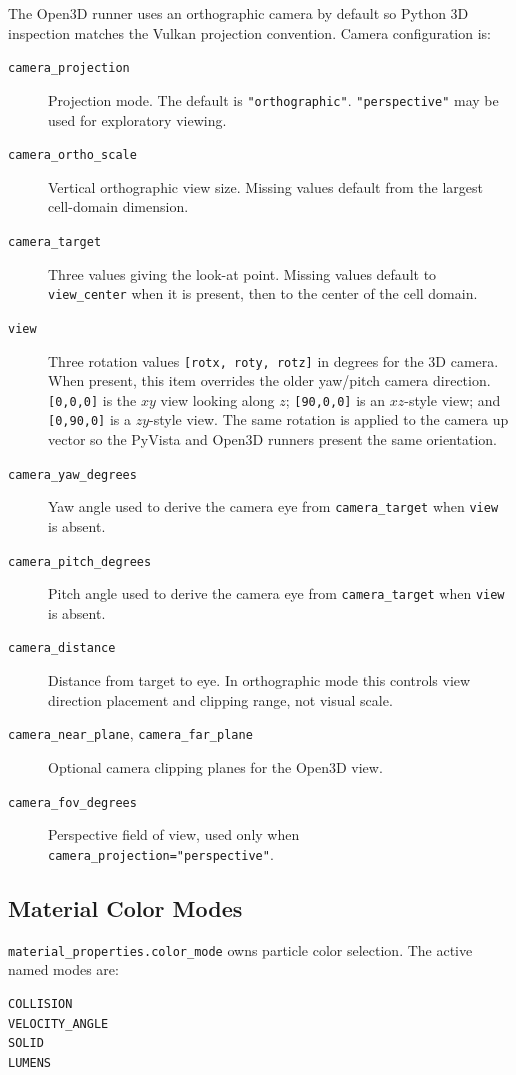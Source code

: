 The Open3D runner uses an orthographic camera by default so Python 3D
inspection matches the Vulkan projection convention.  Camera configuration is:
\begin{description}
    \item[\texttt{camera\_projection}] Projection mode.  The default is
    \texttt{"orthographic"}.  \texttt{"perspective"} may be used for
    exploratory viewing.
    \item[\texttt{camera\_ortho\_scale}] Vertical orthographic view size.
    Missing values default from the largest cell-domain dimension.
    \item[\texttt{camera\_target}] Three values giving the look-at point.
    Missing values default to \texttt{view\_center} when it is present, then
    to the center of the cell domain.
    \item[\texttt{view}] Three rotation values \texttt{[rotx, roty, rotz]} in
    degrees for the 3D camera.  When present, this item overrides the older
    yaw/pitch camera direction.  \texttt{[0,0,0]} is the \(xy\) view looking
    along \(z\); \texttt{[90,0,0]} is an \(xz\)-style view; and
    \texttt{[0,90,0]} is a \(zy\)-style view.  The same rotation is applied
    to the camera up vector so the PyVista and Open3D runners present the same
    orientation.
    \item[\texttt{camera\_yaw\_degrees}] Yaw angle used to derive the camera
    eye from \texttt{camera\_target} when \texttt{view} is absent.
    \item[\texttt{camera\_pitch\_degrees}] Pitch angle used to derive the
    camera eye from \texttt{camera\_target} when \texttt{view} is absent.
    \item[\texttt{camera\_distance}] Distance from target to eye.  In
    orthographic mode this controls view direction placement and clipping
    range, not visual scale.
    \item[\texttt{camera\_near\_plane}, \texttt{camera\_far\_plane}] Optional
    camera clipping planes for the Open3D view.
    \item[\texttt{camera\_fov\_degrees}] Perspective field of view, used only
    when \texttt{camera\_projection="perspective"}.
\end{description}

\subsection{Material Color Modes}

\texttt{material\_properties.color\_mode} owns particle color selection.
The active named modes are:
\begin{verbatim}
COLLISION
VELOCITY_ANGLE
SOLID
LUMENS
\end{verbatim}


